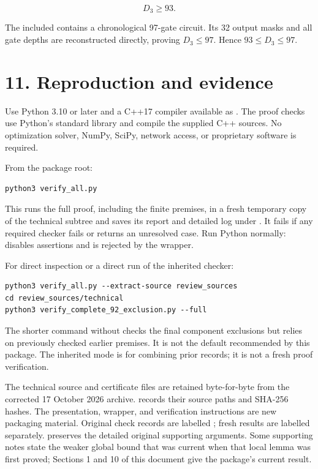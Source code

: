 \[\boxed{D_3\geq93.}\]

The included \texttt{} contains a chronological 97-gate circuit. Its 32 output masks and all gate depths are reconstructed directly, proving \(D_3\leq97\). Hence \(93\leq D_3\leq97\).

\hypertarget{reproduction-and-evidence}{%
\section{11. Reproduction and evidence}\label{reproduction-and-evidence}}

Use Python 3.10 or later and a C++17 compiler available as \texttt{}. The proof checks use Python's standard library and compile the supplied C++ sources. No optimization solver, NumPy, SciPy, network access, or proprietary software is required.

From the package root:

\begin{verbatim}
python3 verify_all.py
\end{verbatim}

This runs the full proof, including the finite premises, in a fresh temporary copy of the technical subtree and saves its report and detailed log under \texttt{}. It fails if any required checker fails or returns an unresolved case. Run Python normally: \texttt{} disables assertions and is rejected by the wrapper.

For direct inspection or a direct run of the inherited checker:

\begin{verbatim}
python3 verify_all.py --extract-source review_sources
cd review_sources/technical
python3 verify_complete_92_exclusion.py --full
\end{verbatim}

The shorter command without \texttt{} checks the final component exclusions but relies on previously checked earlier premises. It is not the default recommended by this package. The inherited \texttt{} mode is for combining prior records; it is not a fresh proof verification.

The technical source and certificate files are retained byte-for-byte from the corrected 17 October 2026 archive. \texttt{} records their source paths and SHA-256 hashes. The presentation, wrapper, and verification instructions are new packaging material. Original check records are labelled \texttt{}; fresh results are labelled separately. \texttt{} preserves the detailed original supporting arguments. Some supporting notes state the weaker global bound that was current when that local lemma was first proved; Sections 1 and 10 of this document give the package's current result.


